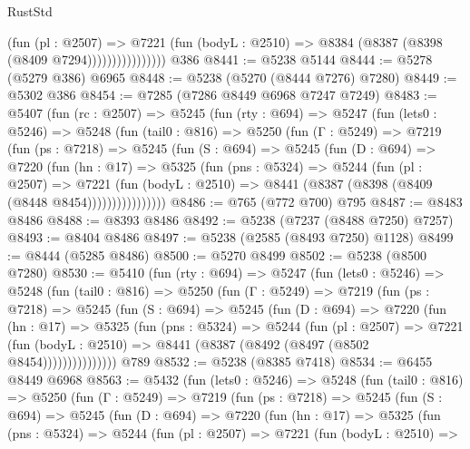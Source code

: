 \begin{lexlean}{RustStd}
\begin{coremodule}
                          (fun (pl : @2507) =>
                          @7221
                            (fun (bodyL : @2510) => @8384 (@8387 (@8398 (@8409 @7294))))))))))))))))
    @386
@8441 := @5238 @5144
@8444 := @5278 (@5279 @386) @6965
@8448 := @5238 (@5270 (@8444 @7276) @7280)
@8449 := @5302 @386
@8454 := @7285 (@7286 @8449 @6968 @7247 @7249)
@8483 := @5407
    (fun (rc : @2507) =>
    @5245
      (fun (rty : @694) =>
      @5247
        (fun (lets0 : @5246) =>
        @5248
          (fun (tail0 : @816) =>
          @5250
            (fun (Γ : @5249) =>
            @7219
              (fun (ps : @7218) =>
              @5245
                (fun (S : @694) =>
                @5245
                  (fun (D : @694) =>
                  @7220
                    (fun (hn : @17) =>
                    @5325
                      (fun (pns : @5324) =>
                      @5244
                        (fun (pl : @2507) =>
                        @7221
                          (fun (bodyL : @2510) =>
                          @8441 (@8387 (@8398 (@8409 (@8448 @8454))))))))))))))))
@8486 := @765 (@772 @700) @795
@8487 := @8483 @8486
@8488 := @8393 @8486
@8492 := @5238 (@7237 (@8488 @7250) @7257)
@8493 := @8404 @8486
@8497 := @5238 (@2585 (@8493 @7250) @1128)
@8499 := @8444 (@5285 @8486)
@8500 := @5270 @8499
@8502 := @5238 (@8500 @7280)
@8530 := @5410
    (fun (rty : @694) =>
    @5247
      (fun (lets0 : @5246) =>
      @5248
        (fun (tail0 : @816) =>
        @5250
          (fun (Γ : @5249) =>
          @7219
            (fun (ps : @7218) =>
            @5245
              (fun (S : @694) =>
              @5245
                (fun (D : @694) =>
                @7220
                  (fun (hn : @17) =>
                  @5325
                    (fun (pns : @5324) =>
                    @5244
                      (fun (pl : @2507) =>
                      @7221
                        (fun (bodyL : @2510) =>
                        @8441 (@8387 (@8492 (@8497 (@8502 @8454)))))))))))))))
    @789
@8532 := @5238 (@8385 @7418)
@8534 := @6455 @8449 @6968
@8563 := @5432
    (fun (lets0 : @5246) =>
    @5248
      (fun (tail0 : @816) =>
      @5250
        (fun (Γ : @5249) =>
        @7219
          (fun (ps : @7218) =>
          @5245
            (fun (S : @694) =>
            @5245
              (fun (D : @694) =>
              @7220
                (fun (hn : @17) =>
                @5325
                  (fun (pns : @5324) =>
                  @5244
                    (fun (pl : @2507) =>
                    @7221
                      (fun (bodyL : @2510) =>

\end{coremodule}
\end{lexlean}
